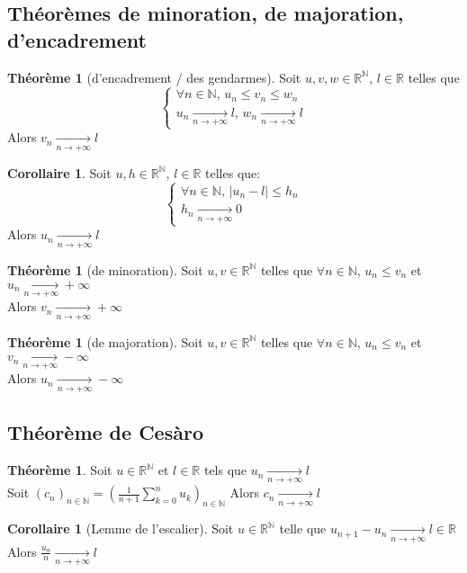 \documentclass[10pt,a4paper]{article}
\theoremstyle{definition}
\newtheorem{theorem}[proposition]{Théorème}
\newtheorem{corollaire}[proposition]{Corollaire}
\begin{document}
\subsection{Théorèmes de minoration, de majoration, d'encadrement}
\begin{theorem}[d'encadrement / des gendarmes]
Soit $u, v, w \in \mathbb{R}^\mathbb{N}$, $l \in \mathbb{R}$ telles que \[\begin{cases} \forall n \in \mathbb{N}, \, u_n \leq v_n \leq w_n \\ u_n \xrightarrow[n \to +\infty]{} l, \, w_n \xrightarrow[n \to +\infty]{} l\end{cases}\]
Alors $v_n \xrightarrow[n \to +\infty]{} l$
\end{theorem}
\begin{corollaire}
Soit $u, h \in \mathbb{R}^\mathbb{N}$, $l \in \mathbb{R}$ telles que:
\[\begin{cases}
\forall n \in \mathbb{N},\, |u_n - l| \leq h_n \\
h_n \xrightarrow[n \to +\infty]{} 0
\end{cases}\]
Alors $u_n \xrightarrow[n \to +\infty]{} l$
\end{corollaire}
\begin{theorem}[de minoration]
Soit $u, v \in \mathbb{R}^\mathbb{N}$ telles que $\forall n \in \mathbb{N}$, $u_n \leq v_n$ et $u_n \xrightarrow[n \to +\infty]{} +\infty$ \\
Alors $v_n \xrightarrow[n \to +\infty]{} +\infty$
\end{theorem}
\begin{theorem}[de majoration]
Soit $u, v \in \mathbb{R}^\mathbb{N}$ telles que $\forall n \in \mathbb{N}$, $u_n \leq v_n$ et $v_n \xrightarrow[n \to +\infty]{} -\infty$ \\
Alors $u_n \xrightarrow[n \to +\infty]{} -\infty$
\end{theorem}

\subsection{Théorème de Cesàro}
\begin{theorem}
Soit $u \in \mathbb{R}^\mathbb{N}$ et $l \in \mathbb{R}$ tels que $u_n \xrightarrow[n \to +\infty]{} l$ \\
Soit $(c_n)_{n \in \mathbb{N}} = \left( \frac{1}{n + 1} \sum\limits_{k = 0}^n u_k \right)_{n \in \mathbb{N}}$ Alors $c_n \xrightarrow[n \to +\infty]{} l$
\end{theorem}
\begin{corollaire}[Lemme de l'escalier]
Soit $u \in \mathbb{R}^\mathbb{N}$ telle que $u_{n + 1} - u_n \xrightarrow[n \to +\infty]{} l \in \mathbb{R}$ \\
Alors $\frac{u_n}{n} \xrightarrow[n \to +\infty]{} l$
\end{corollaire}
\end{document}
